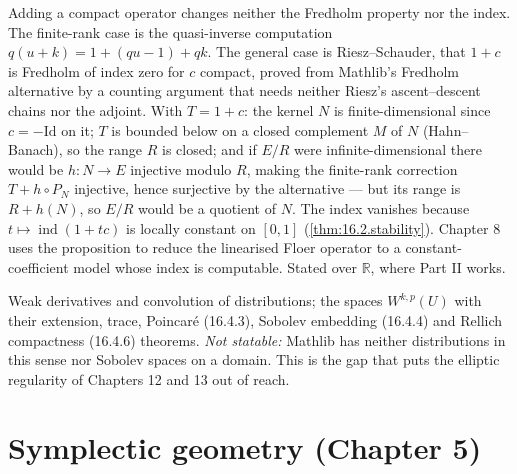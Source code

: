 \begin{proposition}
  \label{prop:16.2.7}
  \leanok
  Adding a compact operator changes neither the Fredholm property nor the index.
  The finite-rank case is the quasi-inverse computation
  $q(u+k) = 1 + (qu-1) + qk$.  The general case is Riesz--Schauder, that $1+c$
  is Fredholm of index zero for $c$ compact, proved from Mathlib's Fredholm
  alternative by a counting argument that needs neither Riesz's ascent--descent
  chains nor the adjoint.  With $T = 1 + c$: the kernel $N$ is
  finite-dimensional since $c = -\mathrm{Id}$ on it; $T$ is bounded below on a
  closed complement $M$ of $N$ (Hahn--Banach), so the range $R$ is closed; and
  if $E/R$ were infinite-dimensional there would be $h : N \to E$ injective
  modulo $R$, making the finite-rank correction $T + h\circ P_N$ injective,
  hence surjective by the alternative --- but its range is $R + h(N)$, so $E/R$
  would be a quotient of $N$.  The index vanishes because $t \mapsto
  \operatorname{ind}(1 + tc)$ is locally constant on $[0,1]$
  (\ref{thm:16.2.stability}).  Chapter 8 uses the proposition to reduce the
  linearised Floer operator to a constant-coefficient model whose index is
  computable.  Stated over $\mathbb{R}$, where Part II works.
\end{proposition}


\begin{theorem}
  \label{thm:16.4}
  \notready
  Weak derivatives and convolution of distributions; the spaces $W^{k,p}(U)$
  with their extension, trace, Poincar\'e (16.4.3), Sobolev embedding (16.4.4)
  and Rellich compactness (16.4.6) theorems.
  \emph{Not statable:} Mathlib has neither distributions in this sense nor
  Sobolev spaces on a domain.  This is the gap that puts the elliptic regularity
  of Chapters 12 and 13 out of reach.
\end{theorem}

\chapter{Symplectic geometry (Chapter 5)}

